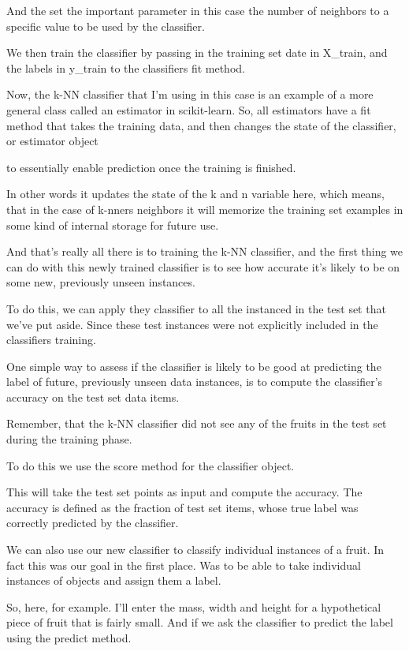 \begin{multicols}{2}
And the set the important parameter in this case the number of neighbors to a specific value to be used by the classifier. 

We then train the classifier by passing in the training set date in X_train, and the labels in y_train to the classifiers fit method. 

Now, the k-NN classifier that I'm using in this case is an example of a more general class called an estimator in scikit-learn. So, all estimators have a fit method that takes the training data, and then changes the state of the classifier, or estimator object 

to essentially enable prediction once the training is finished. 

In other words it updates the state of the k and n variable here, which means, that in the case of k-nners neighbors it will memorize the training set examples in some kind of internal storage for future use. 

And that's really all there is to training the k-NN classifier, and the first thing we can do with this newly trained classifier is to see how accurate it's likely to be on some new, previously unseen instances. 

To do this, we can apply they classifier to all the instanced in the test set that we've put aside. Since these test instances were not explicitly included in the classifiers training. 

One simple way to assess if the classifier is likely to be good at predicting the label of future, previously unseen data instances, is to compute the classifier's accuracy on the test set data items. 

Remember, that the k-NN classifier did not see any of the fruits in the test set during the training phase. 

To do this we use the score method for the classifier object. 

This will take the test set points as input and compute the accuracy. The accuracy is defined as the fraction of test set items, whose true label was correctly predicted by the classifier. 

We can also use our new classifier to classify individual instances of a fruit. In fact this was our goal in the first place. Was to be able to take individual instances of objects and assign them a label. 

So, here, for example. I'll enter the mass, width and height for a hypothetical piece of fruit that is fairly small. And if we ask the classifier to predict the label using the predict method. 


\end{multicols}
